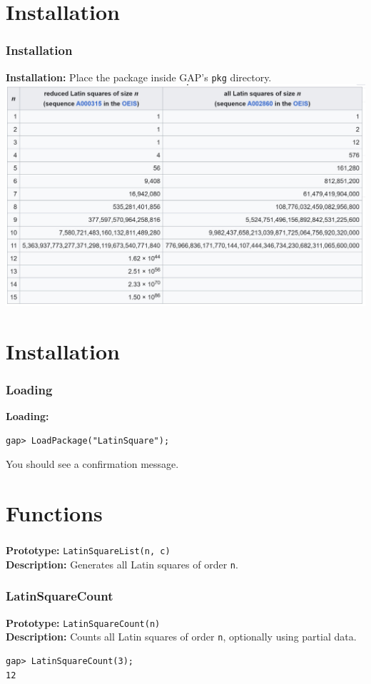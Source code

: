 \documentclass{beamer}
\begin{document}
\section{Installation}
\begin{frame}[fragile]
\frametitle{Installation}
\textbf{Installation:}  
Place the package inside GAP's \texttt{pkg} directory.\\
\includegraphics[width=1\textwidth]{img18}\\
\end{frame}

\section{Installation}
\begin{frame}[fragile]
\frametitle{Loading}
\textbf{Loading:}
\begin{lstlisting}
gap> LoadPackage("LatinSquare");
\end{lstlisting}
You should see a confirmation message.
\end{frame}

\section{Functions}
\begin{frame}[fragile]
\frametitle{}
\textbf{Prototype:} \texttt{LatinSquareList(n, c)}\\
\textbf{Description:} Generates all Latin squares of order \texttt{n}.
\end{frame}

\begin{frame}[fragile]
\frametitle{LatinSquareCount}
\textbf{Prototype:} \texttt{LatinSquareCount(n)}\\
\textbf{Description:} Counts all Latin squares of order \texttt{n}, optionally using partial data.
\begin{lstlisting}
gap> LatinSquareCount(3);
12
\end{lstlisting}
\end{frame}
\end{document}
